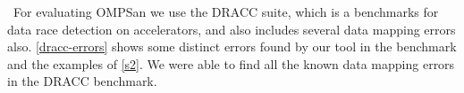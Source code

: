 \
For evaluating OMPSan we use the DRACC\cite{dracc-benchmark} suite, which is a 
benchmarks for data race detection on accelerators, and
also includes several data mapping errors also.
\autoref{dracc-errors} shows some distinct errors found 
by our tool in the benchmark\cite{dracc-benchmark} and the examples of
\autoref{s2}. We were able to find all the known 
data mapping errors in the DRACC benchmark. 
